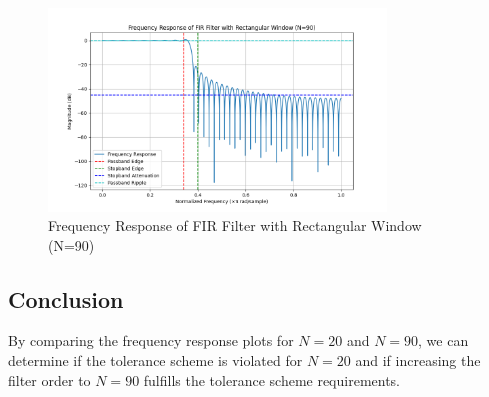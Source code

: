 \begin{figure}[h]
    \centering
    \includegraphics[width=0.8\textwidth]{fig/ex4_f_frequency_response_90.png}
    \caption{Frequency Response of FIR Filter with Rectangular Window (N=90)}
    \label{fig:ex4_f_frequency_response_90}
\end{figure}

\subsection*{Conclusion}
By comparing the frequency response plots for \( N = 20 \) and \( N = 90 \), we can determine if the tolerance scheme is violated for \( N = 20 \) and if increasing the filter order to \( N = 90 \) fulfills the tolerance scheme requirements.
